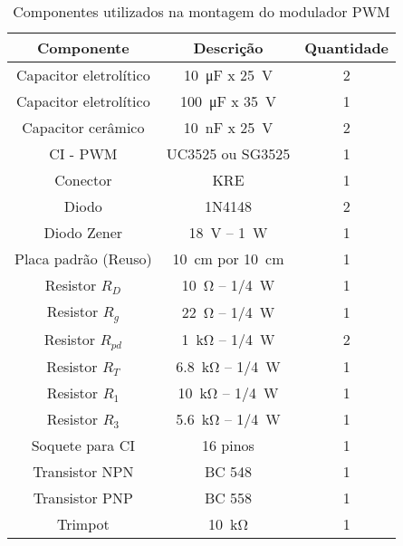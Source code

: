\begin{table}[!ht]
	\centering
	\caption{Componentes utilizados na montagem do modulador PWM}
	\label{tab:componentesPWM}
	\begin{tabular}{@{}ccc@{}}
		\toprule
		\textbf{Componente} & \textbf{Descrição} & \textbf{Quantidade} \\ \midrule			
		Capacitor eletrolítico          & \SI{10}{\micro\farad} x \SI{25}{\V}      & 2  \\		
		Capacitor eletrolítico          & \SI{100}{\micro\farad} x \SI{35}{\V}      & 1  \\
		Capacitor cerâmico          & \SI{10}{\nano\farad} x \SI{25}{\V}      & 2  \\
			CI - PWM      & UC3525 ou SG3525            & 1                   \\
			Conector       & KRE   & 1    \\
				Diodo              & 1N4148             & 2                   \\
			Diodo   Zener          &  \SI{18}{\V} -- \SI{1}{\W}              & 1        \\
				Placa padrão (Reuso)        & \SI{10}{\cm} por \SI{10}{\cm}         & 1    \\
				Resistor  $R_D$     & \SI{10}{\ohm} -- \SI{1/4}{\W}    & 1    \\	
		 Resistor   $R_g$    & \SI{22}{\ohm} -- \SI{1/4}{\W}    & 1    \\
	    Resistor  $R_{pd}$     & \SI{1}{\kilo\ohm} -- \SI{1/4}{\W}    & 2     \\	     
	       Resistor  $R_T$     & \SI{6.8}{\kilo\ohm} -- \SI{1/4}{\W}    & 1    \\
	        Resistor  $R_1$     & \SI{10}{\kilo\ohm} -- \SI{1/4}{\W}    & 1    \\ 
	       Resistor  $R_3$     & \SI{5.6}{\kilo\ohm} -- \SI{1/4}{\W}    & 1    \\              
	          	Soquete para CI        & 16 pinos           & 1                   \\
	       	Transistor    NPN          & BC 548             & 1          \\
	       Transistor    PNP          & BC 558             & 1          \\
	          Trimpot       & \SI{10}{\kilo\ohm}    & 1    \\  \bottomrule	
	\end{tabular}
\end{table}



